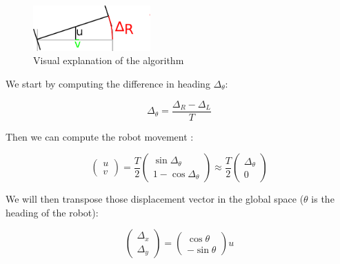 \documentclass[a4paper]{paper}
\begin{document}
\begin{figure}[h]
    \begin{center}
        \includegraphics[width=0.4\textwidth]{algorithm.png}
        \caption{Visual explanation of the algorithm}
    \end{center}
\end{figure}

We start by computing the difference in heading $\Delta_\theta$:

\begin{equation}
    \Delta_\theta = \frac{\Delta_R - \Delta_L}{T}
\end{equation}

Then we can compute the robot movement :

\begin{equation}
    \begin{pmatrix}
        u\\v
    \end{pmatrix}  
    =
    \frac{T}{2}
    \begin{pmatrix}
        \sin \Delta_\theta\\1 - \cos \Delta_\theta
    \end{pmatrix}
    \approx
    \frac{T}{2}
    \begin{pmatrix}
        \Delta_\theta\\ 0
    \end{pmatrix}
\end{equation}

We will then transpose those displacement vector in the global space ($\theta$ is the heading of the robot):

\begin{equation}
    \begin{pmatrix}
        \Delta_x\\\Delta_y
    \end{pmatrix}
    =
    \begin{pmatrix}
        \cos\theta \\-\sin\theta
    \end{pmatrix}
    u 
\end{equation}
\end{document}
